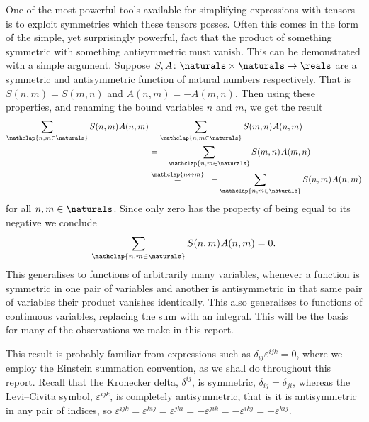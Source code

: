 \documentclass[fleqn]{NotesClass}
\begin{document}
    One of the most powerful tools available for simplifying expressions with tensors is to exploit symmetries which these tensors posses.
    Often this comes in the form of the simple, yet surprisingly powerful, fact that the product of something symmetric with something antisymmetric must vanish.
    This can be demonstrated with a simple argument.
    Suppose \(S, A \colon \naturals \times \naturals \to \reals\) are a symmetric and antisymmetric function of natural numbers respectively.
    That is \(S(n, m) = S(m, n)\) and \(A(n, m) = -A(m, n)\).
    Then using these properties, and renaming the bound variables \(n\) and \(m\), we get the result
    \begin{alignat}{3}
        \sum_{\mathclap{n, m \in \naturals}} S(n, m)\mkern1muA(n, m) &= \sum_{\mathclap{n, m \in \naturals}} S(m, n)\mkern1muA(n, m)\\
        &= -\sum_{\mathclap{n, m \in \naturals}} S(m, n)\mkern1muA(m, n)\\
        &\overset{\mathclap{n \leftrightarrow m}}{=} \mkern10mu -\sum_{\mathclap{n, m \in \naturals}} S(n, m)\mkern1muA(n, m)
    \end{alignat}
    for all \(n, m \in \naturals\).
    Since only zero has the property of being equal to its negative we conclude
    \begin{equation}
        \sum_{\mathclap{n,m\in\naturals}} S(n, m)\mkern1mu A(n, m) = 0.
    \end{equation}
    This generalises to functions of arbitrarily many variables, whenever a function is symmetric in one pair of variables and another is antisymmetric in that same pair of variables their product vanishes identically.
    This also generalises to functions of continuous variables, replacing the sum with an integral.
    This will be the basis for many of the observations we make in this report.
    
    This result is probably familiar from expressions such as \(\delta_{ij}\varepsilon^{ijk} = 0\), where we employ the Einstein summation convention, as we shall do throughout this report.
    Recall that the Kronecker delta, \(\delta^{ij}\), is symmetric, \(\delta_{ij} = \delta_{ji}\), whereas the Levi--Civita symbol, \(\varepsilon^{ijk}\), is completely antisymmetric, that is it is antisymmetric in any pair of indices, so \(\varepsilon^{ijk} = \varepsilon^{kij} = \varepsilon^{jki} = -\varepsilon^{jik} = -\varepsilon^{ikj} = -\varepsilon^{kij}\).
    
\end{document}
